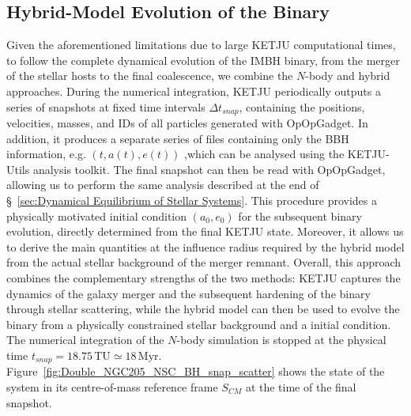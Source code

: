 \documentclass[12pt,twoside,openany]{book}
\begin{document}
\subsection{Hybrid-Model Evolution of the Binary}

Given the aforementioned limitations due to large KETJU computational times, to follow the complete dynamical evolution of the IMBH binary, from the merger of the stellar hosts to the final coalescence, we combine the $N$-body and hybrid approaches. During the numerical integration, KETJU periodically outputs a series of snapshots at fixed time intervals $\Delta t_{snap}$, containing the positions, velocities, masses, and IDs of all particles generated with OpOpGadget. In addition, it produces a separate series of files containing only the BBH information, e.g. $(t,a(t),e(t))$ ,which can be analysed using the KETJU-Utils analysis toolkit. The final snapshot can then be read with OpOpGadget, allowing us to perform the same analysis described at the end of \S~\ref{sec:Dynamical Equilibrium of Stellar Systems}. This procedure provides a physically motivated initial condition $(a_0,e_0)$ for the subsequent binary evolution, directly determined from the final KETJU state. Moreover, it allows us to derive the main quantities at the influence radius required by the hybrid model from the actual stellar background of the merger remnant. Overall, this approach combines the complementary strengths of the two methods: KETJU captures the dynamics of the galaxy merger and the subsequent hardening of the binary through stellar scattering, while the hybrid model can then be used to evolve the binary from a physically constrained stellar background and a initial condition.\\The numerical integration of the $N$-body simulation is stopped at the physical time $t_{snap} = 18.75\,\mathrm{TU} \simeq 18\,\mathrm{Myr}$. Figure~\ref{fig:Double_NGC205_NSC_BH_snap_scatter} shows the state of the system in its centre-of-mass reference frame $S_{CM}$ at the time of the final snapshot.
\end{document}

